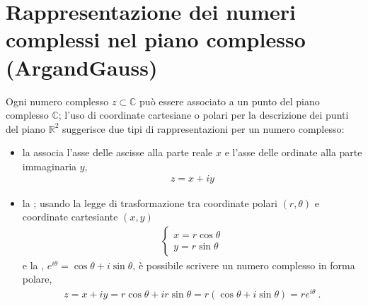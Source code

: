 \documentclass[letterpaper,10pt,italian]{jupyterBook}
\begin{document}
\section{Rappresentazione dei numeri complessi nel piano complesso (Argand\sphinxhyphen{}Gauss)}
\label{\detokenize{ch/algebra/complex-algebra:rappresentazione-dei-numeri-complessi-nel-piano-complesso-argand-gauss}}\label{\detokenize{ch/algebra/complex-algebra:math-hs-algebra-complex-complex-plane}}
\sphinxAtStartPar
Ogni numero complesso \(z \subset \mathbb{C}\) può essere associato a un punto del piano complesso \(\mathbb{C}\); l’uso di coordinate cartesiane o polari per la descrizione dei punti del piano \(\mathbb{R}^2\) suggerisce due tipi di rappresentazioni per un numero complesso:
\begin{itemize}
\item {} 
\sphinxAtStartPar
la  associa l’asse delle ascisse alla parte reale \(x\) e l’asse delle ordinate alla parte immaginaria \(y\),
\begin{equation*}
\begin{split}z = x + i y\end{split}
\end{equation*}
\item {} 
\sphinxAtStartPar
la ; usando la legge di trasformazione tra coordinate polari \((r, \theta)\) e coordinate cartesiante \((x,y)\)
\begin{equation*}
\begin{split}\begin{cases}
    x = r \cos \theta \\
    y = r \sin \theta
  \end{cases}\end{split}
\end{equation*}
\sphinxAtStartPar
e la {\hyperref[\detokenize{ch/algebra/complex-algebra-notes:math-hs-algebra-complex-notes-euler}]{}}, \(e^{i \theta} = \cos \theta + i \sin \theta\), è possibile scrivere un numero complesso in forma polare,
\begin{equation*}
\begin{split}z = x + i y = r \cos \theta + i r \sin \theta = r \left( \cos \theta + i \sin \theta \right) = r e^{i \theta} \ .\end{split}
\end{equation*}
\end{itemize}
\end{document}
